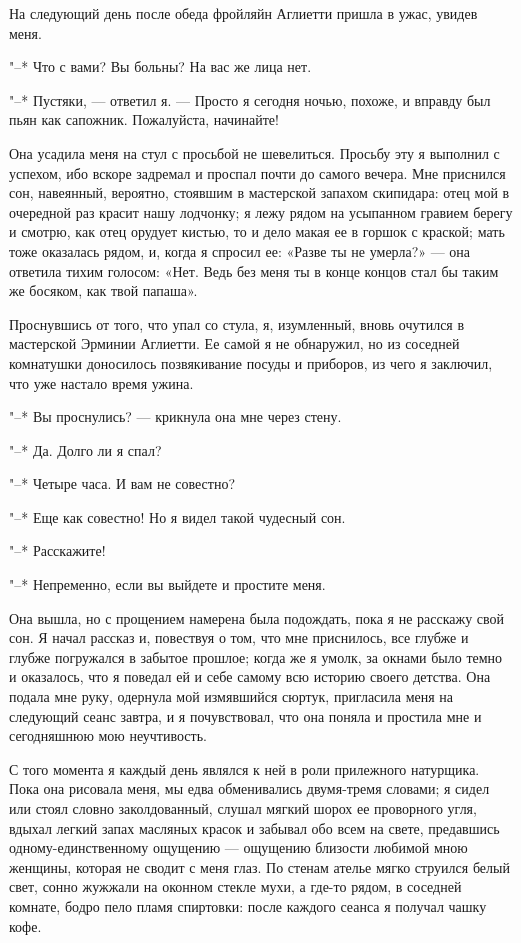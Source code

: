 На следующий день после обеда  фройляйн Аглиетти пришла в ужас, увидев
меня.

"--* Что с вами? Вы больны? На вас же лица нет.

"--* Пустяки,  --- ответил я.  --- Просто  я сегодня ночью,  похоже, и
вправду был пьян как сапожник. Пожалуйста, начинайте!

Она  усадила меня  на стул  с просьбой  не шевелиться.  Просьбу эту  я
выполнил  с успехом,  ибо вскоре  задремал и  проспал почти  до самого
вечера. Мне приснился сон,  навеянный, вероятно, стоявшим в мастерской
запахом скипидара:  отец мой в  очередной раз красит нашу  лодчонку; я
лежу  рядом на  усыпанном гравием  берегу и  смотрю, как  отец орудует
кистью, то  и дело макая  ее в горшок  с краской; мать  тоже оказалась
рядом, и, когда  я спросил ее: «Разве ты не  умерла?» --- она ответила
тихим голосом: «Нет. Ведь без меня ты  в конце концов стал бы таким же
босяком, как твой папаша».

Проснувшись от того, что упал  со стула, я, изумленный, вновь очутился
в мастерской Эрминии Аглиетти. Ее самой я не обнаружил, но из соседней
комнатушки  доносилось  позвякивание  посуды  и приборов,  из  чего  я
заключил, что уже настало время ужина.

"--* Вы проснулись? --- крикнула она мне через стену.

"--* Да. Долго ли я спал?

"--* Четыре часа. И вам не совестно?

"--* Еще как совестно! Но я видел такой чудесный сон.

"--* Расскажите!

"--* Непременно, если вы выйдете и простите меня.

Она вышла, но с прощением намерена  была подождать, пока я не расскажу
свой сон. Я начал рассказ и,  повествуя о том, что мне приснилось, все
глубже и  глубже погружался в  забытое прошлое;  когда же я  умолк, за
окнами было  темно и  оказалось, что  я поведал ей  и себе  самому всю
историю своего детства.  Она подала мне руку,  одернула мой измявшийся
сюртук, пригласила меня  на следующий сеанс завтра,  и я почувствовал,
что она поняла и простила мне и сегодняшнюю мою неучтивость.

С  того  момента  я  каждый  день являлся  к  ней  в  роли  прилежного
натурщика. Пока  она рисовала  меня, мы едва  обменивались двумя-тремя
словами; я сидел  или стоял словно заколдованный,  слушал мягкий шорох
ее проворного угля, вдыхал легкий  запах масляных красок и забывал обо
всем на  свете, предавшись одному-единственному ощущению  --- ощущению
близости  любимой мною  женщины, которая  не  сводит с  меня глаз.  По
стенам  ателье мягко  струился белый  свет, сонно  жужжали на  оконном
стекле  мухи, а  где-то рядом,  в соседней  комнате, бодро  пело пламя
спиртовки: после каждого сеанса я получал чашку кофе.

